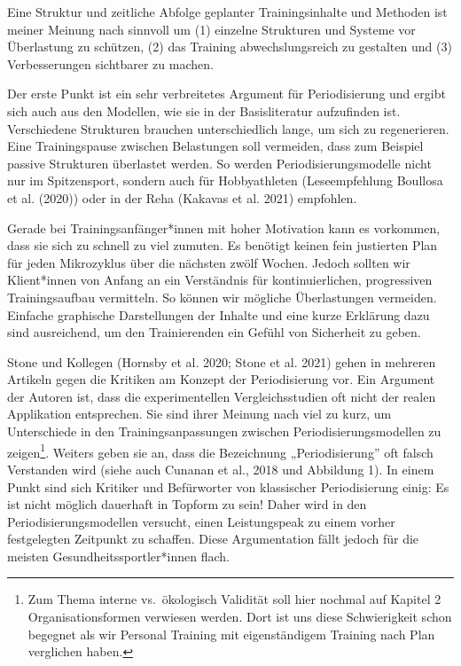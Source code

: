 \documentclass[
  letterpaper,
  DIV=11,
  numbers=noendperiod]{scrreprt}
\begin{document}
Eine Struktur und zeitliche Abfolge geplanter Trainingsinhalte und
Methoden ist meiner Meinung nach sinnvoll um (1) einzelne Strukturen und
Systeme vor Überlastung zu schützen, (2) das Training abwechslungsreich
zu gestalten und (3) Verbesserungen sichtbarer zu machen.

Der erste Punkt ist ein sehr verbreitetes Argument für Periodisierung
und ergibt sich auch aus den Modellen, wie sie in der Basisliteratur
aufzufinden ist. Verschiedene Strukturen brauchen unterschiedlich lange,
um sich zu regenerieren. Eine Trainingspause zwischen Belastungen soll
vermeiden, dass zum Beispiel passive Strukturen überlastet werden. So
werden Periodisierungsmodelle nicht nur im Spitzensport, sondern auch
für Hobbyathleten (Leseempfehlung Boullosa et al. (2020)) oder in der
Reha (Kakavas et al. 2021) empfohlen.

Gerade bei Trainingsanfänger*innen mit hoher Motivation kann es
vorkommen, dass sie sich zu schnell zu viel zumuten. Es benötigt keinen
fein justierten Plan für jeden Mikrozyklus über die nächsten zwölf
Wochen. Jedoch sollten wir Klient*innen von Anfang an ein Verständnis
für kontinuierlichen, progressiven Trainingsaufbau vermitteln. So können
wir mögliche Überlastungen vermeiden. Einfache graphische Darstellungen
der Inhalte und eine kurze Erklärung dazu sind ausreichend, um den
Trainierenden ein Gefühl von Sicherheit zu geben.

Stone und Kollegen (Hornsby et al. 2020; Stone et al. 2021) gehen in
mehreren Artikeln gegen die Kritiken am Konzept der Periodisierung vor.
Ein Argument der Autoren ist, dass die experimentellen Vergleichsstudien
oft nicht der realen Applikation entsprechen. Sie sind ihrer Meinung
nach viel zu kurz, um Unterschiede in den Trainingsanpassungen zwischen
Periodisierungsmodellen zu zeigen\footnote{Zum Thema interne
  vs.~ökologisch Validität soll hier nochmal auf Kapitel 2
  Organisationsformen verwiesen werden. Dort ist uns diese Schwierigkeit
  schon begegnet als wir Personal Training mit eigenständigem Training
  nach Plan verglichen haben.}. Weiters geben sie an, dass die
Bezeichnung „Periodisierung'' oft falsch Verstanden wird (siehe auch
Cunanan et al., 2018 und Abbildung 1). In einem Punkt sind sich Kritiker
und Befürworter von klassischer Periodisierung einig: Es ist nicht
möglich dauerhaft in Topform zu sein! Daher wird in den
Periodisierungsmodellen versucht, einen Leistungspeak zu einem vorher
festgelegten Zeitpunkt zu schaffen. Diese Argumentation fällt jedoch für
die meisten Gesundheitssportler*innen flach.
\end{document}
